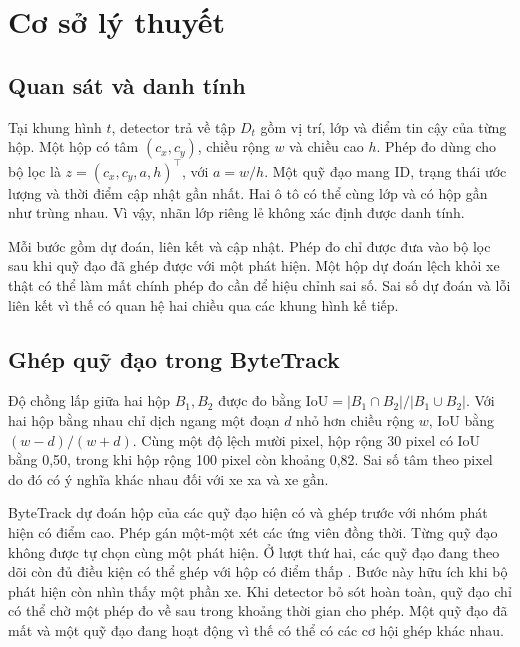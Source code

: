 \chapter{Cơ sở lý thuyết}
\section{Quan sát và danh tính}
Tại khung hình $t$, detector trả về tập $D_t$ gồm vị trí, lớp và điểm tin cậy của từng hộp. Một hộp có tâm $(c_x,c_y)$, chiều rộng $w$ và chiều cao $h$. Phép đo dùng cho bộ lọc là $z=(c_x,c_y,a,h)^\top$, với $a=w/h$. Một quỹ đạo mang ID, trạng thái ước lượng và thời điểm cập nhật gần nhất. Hai ô tô có thể cùng lớp và có hộp gần như trùng nhau. Vì vậy, nhãn lớp riêng lẻ không xác định được danh tính.

Mỗi bước gồm dự đoán, liên kết và cập nhật. Phép đo chỉ được đưa vào bộ lọc sau khi quỹ đạo đã ghép được với một phát hiện. Một hộp dự đoán lệch khỏi xe thật có thể làm mất chính phép đo cần để hiệu chỉnh sai số. Sai số dự đoán và lỗi liên kết vì thế có quan hệ hai chiều qua các khung hình kế tiếp.

\section{Ghép quỹ đạo trong ByteTrack}
Độ chồng lấp giữa hai hộp $B_1,B_2$ được đo bằng $\mathrm{IoU}=|B_1\cap B_2|/|B_1\cup B_2|$. Với hai hộp bằng nhau chỉ dịch ngang một đoạn $d$ nhỏ hơn chiều rộng $w$, IoU bằng $(w-d)/(w+d)$. Cùng một độ lệch mười pixel, hộp rộng 30 pixel có IoU bằng 0,50, trong khi hộp rộng 100 pixel còn khoảng 0,82. Sai số tâm theo pixel do đó có ý nghĩa khác nhau đối với xe xa và xe gần.

ByteTrack dự đoán hộp của các quỹ đạo hiện có và ghép trước với nhóm phát hiện có điểm cao. Phép gán một-một xét các ứng viên đồng thời. Từng quỹ đạo không được tự chọn cùng một phát hiện. Ở lượt thứ hai, các quỹ đạo đang theo dõi còn đủ điều kiện có thể ghép với hộp có điểm thấp \cite{zhang2022bytetrack}. Bước này hữu ích khi bộ phát hiện còn nhìn thấy một phần xe. Khi detector bỏ sót hoàn toàn, quỹ đạo chỉ có thể chờ một phép đo về sau trong khoảng thời gian cho phép. Một quỹ đạo đã mất và một quỹ đạo đang hoạt động vì thế có thể có các cơ hội ghép khác nhau.

